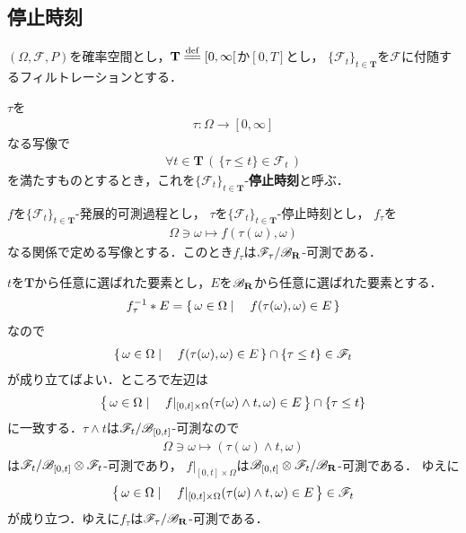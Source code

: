 \subsection{停止時刻}
	$(\Omega,\mathscr{F},P)$を確率空間とし，$\mathbf{T} \defeq [0,\infty[$か$[0,T]$とし，
	$\{\mathscr{F}_t\}_{t \in \mathbf{T}}$を$\mathscr{F}$に付随するフィルトレーションとする．
	
	$\tau$を
	\begin{align}
		\tau:\Omega \longrightarrow [0,\infty]
	\end{align}
	なる写像で
	\begin{align}
		\forall t \in \mathbf{T}\, \left(\, \{\tau \leq t\} \in \mathscr{F}_t\, \right)
	\end{align}
	を満たすものとするとき，これを$\{\mathscr{F}_t\}_{t \in \mathbf{T}}$-{\bf 停止時刻}と呼ぶ．
	
	\begin{screen}
		\begin{thm}[発展的可測過程と停止時刻の合成の可測性]
		\label{thm:composition_of_progressively_measurable_process_and_stopping_time}
			$f$を$\{\mathscr{F}_t\}_{t \in \mathbf{T}}$-発展的可測過程とし，
			$\tau$を$\{\mathscr{F}_t\}_{t \in \mathbf{T}}$-停止時刻とし，
			$f_\tau$を
			\begin{align}
				\Omega \ni \omega \longmapsto f(\tau(\omega),\omega)
			\end{align}
			なる関係で定める写像とする．このとき$f_\tau$は$\mathscr{F}_\tau/\mathscr{B}_{\mathbf{R}}$-可測である．
		\end{thm}
	\end{screen}
	
	\begin{sketch}
		$t$を$\mathbf{T}$から任意に選ばれた要素とし，$E$を$\mathscr{B}_{\mathbf{R}}$から任意に選ばれた要素とする．
		\begin{align}
			f_\tau^{-1} \ast E = \left\{\, \omega \in \Omega \mid \quad f(\tau(\omega),\omega) \in E\, \right\} 
		\end{align}
		なので
		\begin{align}
			\left\{\, \omega \in \Omega \mid \quad f(\tau(\omega),\omega) \in E\, \right\} \cap \{\tau \leq t\}
			\in \mathscr{F}_t
		\end{align}
		が成り立てばよい．ところで左辺は
		\begin{align}
			\left\{\, \omega \in \Omega \mid \quad f|_{[0,t] \times \Omega}(\tau(\omega) \wedge t,\omega) \in E\, \right\} \cap \{\tau \leq t\}
		\end{align}
		に一致する．$\tau \wedge t$は$\mathscr{F}_t/\mathscr{B}_{[0,t]}$-可測なので
		\begin{align}
			\Omega \ni \omega \longmapsto (\tau(\omega) \wedge t,\omega)
		\end{align}
		は$\mathscr{F}_t/\mathscr{B}_{[0,t]} \otimes \mathscr{F}_t$-可測であり，
		$f|_{[0,t] \times \Omega}$は$\mathscr{B}_{[0,t]} \otimes \mathscr{F}_t/\mathscr{B}_{\mathbf{R}}$-可測である．
		ゆえに
		\begin{align}
			\left\{\, \omega \in \Omega \mid \quad f|_{[0,t] \times \Omega}(\tau(\omega) \wedge t,\omega) \in E\, \right\} \in \mathscr{F}_t
		\end{align}
		が成り立つ．ゆえに$f_\tau$は$\mathscr{F}_\tau/\mathscr{B}_{\mathbf{R}}$-可測である．
		\QED
	\end{sketch}
	
	\begin{screen}
		\begin{thm}[任意抽出定理]
			
		\end{thm}
	\end{screen}
	